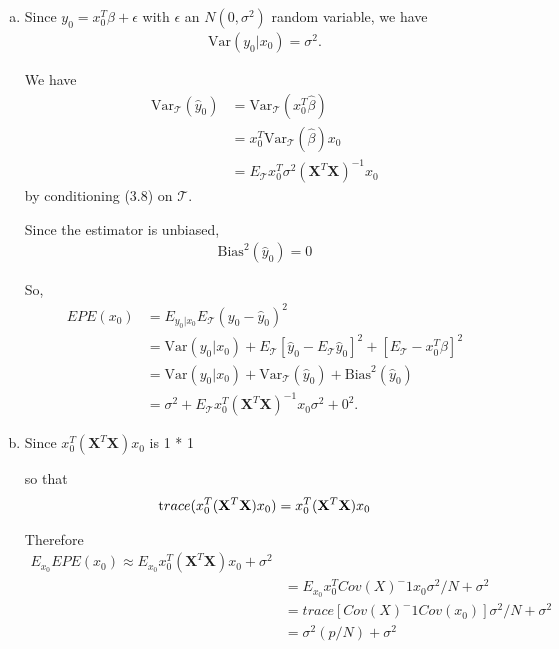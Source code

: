 \documentclass{article}
\begin{document}
\begin{enumerate}[(a)]
    \item
    Since $y_0 = x_0^T \beta + \epsilon$ with $\epsilon$ an $N(0,\sigma^2)$ random variable, we have \begin{align*}
    \text{Var}(y_0|x_0) = \sigma^2.
    \end{align*}

    We have \begin{align*}
        \text{Var}_{\mathcal T}(\hat y_0) &= \text{Var}_{\mathcal T}(x_0^T \hat \beta) \\
                &= x_0^T \text{Var}_{\mathcal T}(\hat \beta) x_0 \\
                &= E_{\mathcal T} x_0^T \sigma^2 (\mathbf{X}^T \mathbf{X})^{-1} x_0
        \end{align*} by conditioning (3.8) on $\mathcal T$.

    Since the estimator is unbiased, \begin{align*}
    \text{Bias}^2(\hat y_0) = 0
    \end{align*}

    So, \begin{align*}
        EPE(x_0) &= E_{y_0 | x_0} E_{\mathcal{T}}(y_0 - \hat y_0)^2 \\
                 &= \text{Var}(y_0|x_0) + E_{\mathcal T}[\hat y_0 - E_{\mathcal T} \hat y_0]^2 + [E_{\mathcal T} - x_0^T \beta]^2 \\
                 &= \text{Var}(y_0 | x_0) + \text{Var}_\mathcal{T}(\hat y_0) + \text{Bias}^2(\hat y_0) \\
                 &= \sigma^2 + E_{\mathcal T} x_0^T (\mathbf{X}^T \mathbf{X})^{-1} x_0\sigma^2 + 0^2.
    \end{align*}

    \item
    Since $x_0^T (\mathbf{X}^T \mathbf{X})x_0$ is 1 * 1

    so that \begin{align*}
      \text trace(x_0^T (\mathbf{X}^T \mathbf{X})x_0) = x_0^T (\mathbf{X}^T \mathbf{X})x_0
    \end{align*}

    Therefore \begin{align*}
    E_{x_0}EPE(x_0) \approx E_{x_0}x_0^T (\mathbf{X}^T \mathbf{X})x_0 + \sigma^2 \\
                    &= E_{x_0}x_0^T Cov(X)^-1 x_0 \sigma^2 /N+ \sigma^2 \\
                    &= trace[Cov(X)^-1 Cov(x_0)] \sigma^2 /N+ \sigma^2 \\
                    &= \sigma^2 (p/N) + \sigma^2
    \end{align*}

\end{enumerate}
\end{document}
